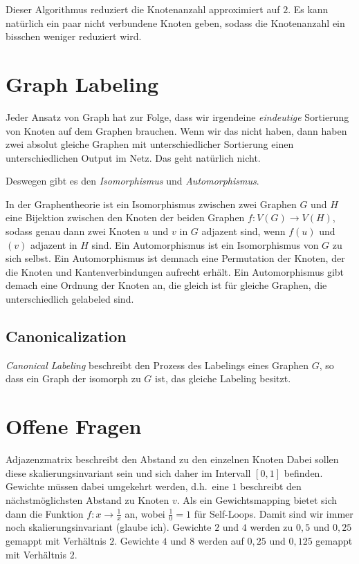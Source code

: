 \documentclass{scrartcl}
\begin{document}
Dieser Algorithmus reduziert die Knotenanzahl approximiert auf $2$.
Es kann natürlich ein paar nicht verbundene Knoten geben, sodass die Knotenanzahl ein bisschen weniger reduziert wird.

\section{Graph Labeling}

Jeder Ansatz von Graph hat zur Folge, dass wir irgendeine \emph{eindeutige} Sortierung von Knoten auf dem Graphen brauchen.
Wenn wir das nicht haben, dann haben zwei absolut gleiche Graphen mit unterschiedlicher Sortierung einen unterschiedlichen Output im Netz.
Das geht natürlich nicht.

Deswegen gibt es den \emph{Isomorphismus} und \emph{Automorphismus}.

In der Graphentheorie ist ein Isomorphismus zwischen zwei Graphen $G$ und $H$ eine Bijektion zwischen den Knoten der beiden Graphen $f: V(G) \rightarrow V(H)$, sodass genau dann zwei Knoten $u$ und $v$ in $G$ adjazent sind, wenn $f(u)$ und $(v)$ adjazent in $H$ sind.
Ein Automorphismus ist ein Isomorphismus von $G$ zu sich selbst.
Ein Automorphismus ist demnach eine Permutation der Knoten, der die Knoten und Kantenverbindungen aufrecht erhält.
Ein Automorphismus gibt demach eine Ordnung der Knoten an, die gleich ist für gleiche Graphen, die unterschiedlich gelabeled sind.

\subsection{Canonicalization}

\emph{Canonical Labeling} beschreibt den Prozess des Labelings eines Graphen $G$, so dass ein Graph der isomorph zu $G$ ist, das gleiche Labeling besitzt.

\section{Offene Fragen}

Adjazenzmatrix beschreibt den Abstand zu den einzelnen Knoten
Dabei sollen diese skalierungsinvariant sein und sich daher im Intervall $[0, 1]$ befinden.
Gewichte müssen dabei umgekehrt werden, d.h.\ eine $1$ beschreibt den nächstmöglichsten Abstand zu Knoten $v$.
Als ein Gewichtsmapping bietet sich dann die Funktion $f: x \rightarrow \frac{1}{x}$ an, wobei $\frac{1}{0} = 1$ für Self-Loops.
Damit sind wir immer noch skalierungsinvariant (glaube ich).
Gewichte $2$ und $4$ werden zu $0,5$ und $0,25$ gemappt mit Verhältnis $2$.
Gewichte $4$ und $8$ werden auf $0,25$ und $0,125$ gemappt mit Verhältnis $2$.
\end{document}
